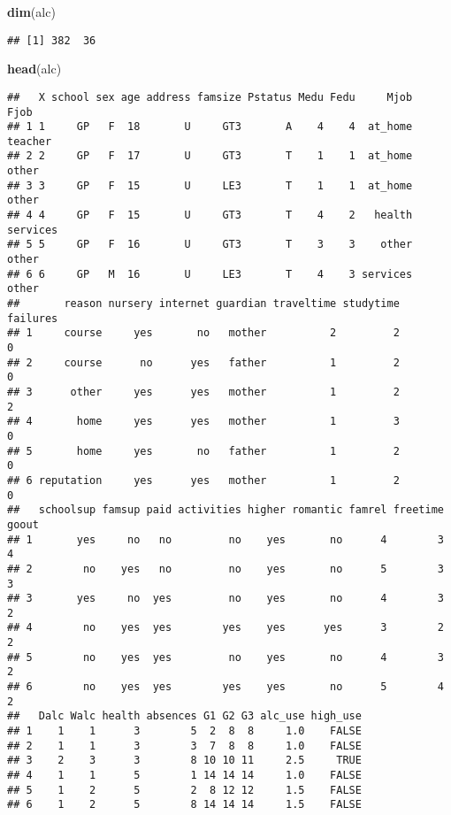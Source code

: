 \documentclass[]{article}
\newenvironment{Shaded}{\begin{snugshade}}{\end{snugshade}}
\newcommand{\KeywordTok}[1]{\textcolor[rgb]{0.13,0.29,0.53}{\textbf{#1}}}
\newcommand{\NormalTok}[1]{#1}
\begin{document}
\begin{Shaded}
\begin{Highlighting}[]
\KeywordTok{dim}\NormalTok{(alc)}
\end{Highlighting}
\end{Shaded}

\begin{verbatim}
## [1] 382  36
\end{verbatim}

\begin{Shaded}
\begin{Highlighting}[]
\KeywordTok{head}\NormalTok{(alc)}
\end{Highlighting}
\end{Shaded}

\begin{verbatim}
##   X school sex age address famsize Pstatus Medu Fedu     Mjob     Fjob
## 1 1     GP   F  18       U     GT3       A    4    4  at_home  teacher
## 2 2     GP   F  17       U     GT3       T    1    1  at_home    other
## 3 3     GP   F  15       U     LE3       T    1    1  at_home    other
## 4 4     GP   F  15       U     GT3       T    4    2   health services
## 5 5     GP   F  16       U     GT3       T    3    3    other    other
## 6 6     GP   M  16       U     LE3       T    4    3 services    other
##       reason nursery internet guardian traveltime studytime failures
## 1     course     yes       no   mother          2         2        0
## 2     course      no      yes   father          1         2        0
## 3      other     yes      yes   mother          1         2        2
## 4       home     yes      yes   mother          1         3        0
## 5       home     yes       no   father          1         2        0
## 6 reputation     yes      yes   mother          1         2        0
##   schoolsup famsup paid activities higher romantic famrel freetime goout
## 1       yes     no   no         no    yes       no      4        3     4
## 2        no    yes   no         no    yes       no      5        3     3
## 3       yes     no  yes         no    yes       no      4        3     2
## 4        no    yes  yes        yes    yes      yes      3        2     2
## 5        no    yes  yes         no    yes       no      4        3     2
## 6        no    yes  yes        yes    yes       no      5        4     2
##   Dalc Walc health absences G1 G2 G3 alc_use high_use
## 1    1    1      3        5  2  8  8     1.0    FALSE
## 2    1    1      3        3  7  8  8     1.0    FALSE
## 3    2    3      3        8 10 10 11     2.5     TRUE
## 4    1    1      5        1 14 14 14     1.0    FALSE
## 5    1    2      5        2  8 12 12     1.5    FALSE
## 6    1    2      5        8 14 14 14     1.5    FALSE
\end{verbatim}
\end{document}
